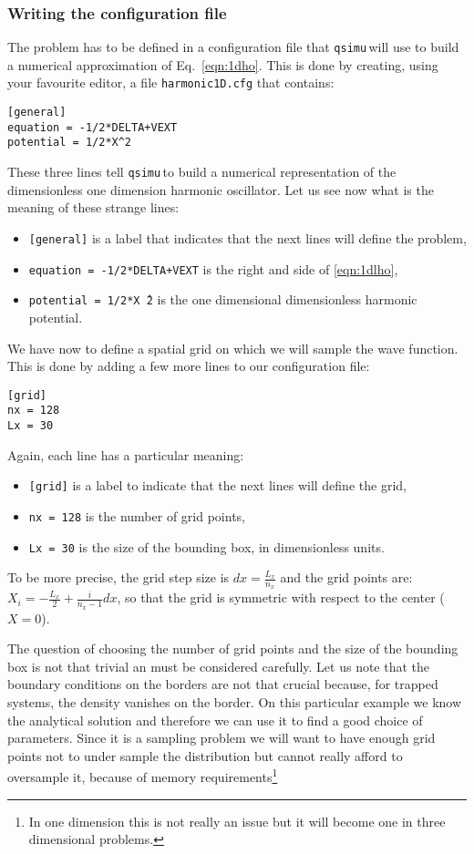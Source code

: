 \documentclass[12pt,a4paper]{report}
\newcommand{\qsimu}{\texttt{qsimu}\,}
\begin{document}
\subsubsection{Writing the configuration file}
The problem has to be defined in a configuration file that \qsimu will use to build a numerical approximation of Eq.~\eqref{eqn:1dho}.
This is done by creating, using your favourite editor, a file \texttt{harmonic1D.cfg} that contains:
\begin{verbatim}
[general]
equation = -1/2*DELTA+VEXT
potential = 1/2*X^2
\end{verbatim}
These three lines tell \qsimu to build a numerical representation of the dimensionless one dimension harmonic oscillator.
Let us see now what is the meaning of these strange lines:
\begin{itemize}
\item\texttt{[general]} is a label that indicates that the next lines will define the problem,
\item\texttt{equation = -1/2*DELTA+VEXT} is the right and side of \eqref{eqn:1dlho},
\item\texttt{potential = 1/2*X\^\,2} is the one dimensional dimensionless harmonic potential.
\end{itemize}

We have now to define a spatial grid on which we will sample the wave function.
This is done by adding a few more lines to our configuration file:
\begin{verbatim}
[grid]
nx = 128
Lx = 30
\end{verbatim}
Again, each line has a particular meaning:
\begin{itemize}
\item \texttt{[grid]} is a label to indicate that the next lines will define the grid,
\item \texttt{nx = 128} is the number of grid points,
\item \texttt{Lx = 30} is the size of the bounding box, in dimensionless units.
\end{itemize}
To be more precise, the grid step size is $dx=\frac{L_x}{n_x}$ and the grid points are: $X_i=-\frac{L_x}{2}+\frac{i}{n_x-1}dx$, so that the grid is symmetric with respect to the center ($X=0$).

The question of choosing the number of grid points and the size of the bounding box is not that trivial an must be considered carefully.
Let us note that the boundary conditions on the borders are not that crucial because, for trapped systems, the density vanishes on the border.
On this particular example we know the analytical solution and therefore we can use it to find a good choice of parameters.
Since it is a sampling problem we will want to have enough grid points not to under sample the distribution but cannot really afford to oversample it, because of memory requirements\footnote{In one dimension this is not really an issue but it will become one in three dimensional problems.}
\end{document}
